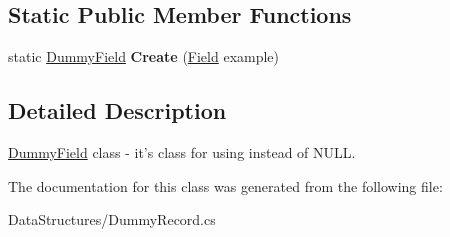\subsection*{Static Public Member Functions}
\begin{DoxyCompactItemize}
\item 
\hypertarget{class_dwarf_d_b_1_1_data_structures_1_1_dummy_field_aa36da679dfc36a7647002ef65055cca4}{
static \hyperlink{class_dwarf_d_b_1_1_data_structures_1_1_dummy_field}{DummyField} {\bfseries Create} (\hyperlink{class_dwarf_d_b_1_1_data_structures_1_1_field}{Field} example)}
\label{class_dwarf_d_b_1_1_data_structures_1_1_dummy_field_aa36da679dfc36a7647002ef65055cca4}

\end{DoxyCompactItemize}


\subsection{Detailed Description}
\hyperlink{class_dwarf_d_b_1_1_data_structures_1_1_dummy_field}{DummyField} class -\/ it's class for using instead of NULL. 

The documentation for this class was generated from the following file:\begin{DoxyCompactItemize}
\item 
DataStructures/DummyRecord.cs\end{DoxyCompactItemize}
